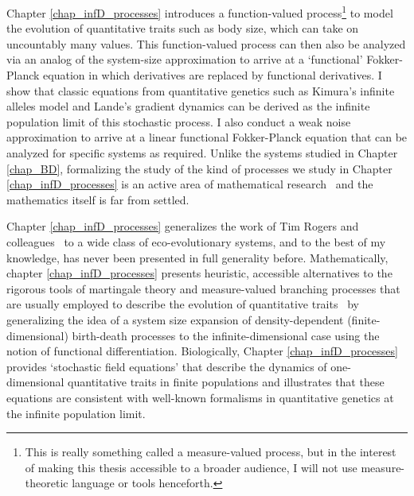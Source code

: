 Chapter \ref{chap_infD_processes} introduces a function-valued process\footnote{This is really something called a measure-valued process, but in the interest of making this thesis accessible to a broader audience, I will not use measure-theoretic language or tools henceforth.} to model the evolution of quantitative traits such as body size, which can take on uncountably many values. This function-valued process can then also be analyzed via an analog of the system-size approximation to arrive at a `functional' Fokker-Planck equation in which derivatives are replaced by functional derivatives. I show that classic equations from quantitative genetics such as Kimura's infinite alleles model and Lande's gradient dynamics can be derived as the infinite population limit of this stochastic process. I also conduct a weak noise approximation to arrive at a linear functional Fokker-Planck equation that can be analyzed for specific systems as required. Unlike the systems studied in Chapter \ref{chap_BD}, formalizing the study of the kind of processes we study in Chapter \ref{chap_infD_processes} is an active area of mathematical research~\citep{carmona_stochastic_1999,da_prato_stochastic_2014,prevot_concise_2007,liu_stochastic_2015,bogachev_fokker-planck-kolmogorov_2015,balan_gentle_2018} and the mathematics itself is far from settled.

Chapter \ref{chap_infD_processes} generalizes the work of Tim Rogers and colleagues~\citep{rogers_demographic_2012,rogers_spontaneous_2012,rogers_modes_2015} to a wide class of eco-evolutionary systems, and to the best of my knowledge, has never been presented in full generality before. Mathematically, chapter \ref{chap_infD_processes} presents heuristic, accessible alternatives to the rigorous tools of martingale theory and measure-valued branching processes that are usually employed to describe the evolution of quantitative traits~\citep{champagnat_unifying_2006,etheridge_mathematical_2011, week_white_2021} by generalizing the idea of a system size expansion of density-dependent (finite-dimensional) birth-death processes to the infinite-dimensional case using the notion of functional differentiation. Biologically, Chapter \ref{chap_infD_processes} provides `stochastic field equations' that describe the dynamics of one-dimensional quantitative traits in finite populations and illustrates that these equations are consistent with well-known formalisms in quantitative genetics at the infinite population limit.

